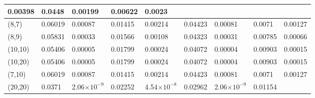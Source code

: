 \documentclass[10pt,twosided]{article}
\numberwithin{equation}{section}
\numberwithin{equation}{section}
\begin{document}
\begin{table}
\begin{tabular}{|p{41pt}|p{32pt}|p{38pt}|p{32pt}|p{38pt}|p{32pt}|p{38pt}|p{32pt}|p{38pt}|}
{0.00398
} & \parbox{32pt}{\raggedright
0.0448
} & \parbox{38pt}{\raggedright
0.00199
} & \parbox{32pt}{\raggedright
0.00622
} & \parbox{38pt}{\raggedright
0.0023
} \\
\hline
\parbox{41pt}{\raggedright
(8,7)
} & \parbox{32pt}{\raggedright
0.06019
} & \parbox{38pt}{\raggedright
0.00087
} & \parbox{32pt}{\raggedright
0.01415
} & \parbox{38pt}{\raggedright
0.00214
} & \parbox{32pt}{\raggedright
0.04423
} & \parbox{38pt}{\raggedright
0.00081
} & \parbox{32pt}{\raggedright
0.0071
} & \parbox{38pt}{\raggedright
0.00127
} \\
\hline
\parbox{41pt}{\raggedright
(8,9)
} & \parbox{32pt}{\raggedright
0.05831
} & \parbox{38pt}{\raggedright
0.00033
} & \parbox{32pt}{\raggedright
0.01566
} & \parbox{38pt}{\raggedright
0.00108
} & \parbox{32pt}{\raggedright
0.04323
} & \parbox{38pt}{\raggedright
0.00031
} & \parbox{32pt}{\raggedright
0.00785
} & \parbox{38pt}{\raggedright
0.00066
} \\
\hline
\parbox{41pt}{\raggedright
(10,10)
} & \parbox{32pt}{\raggedright
0.05406
} & \parbox{38pt}{\raggedright
0.00005
} & \parbox{32pt}{\raggedright
0.01799
} & \parbox{38pt}{\raggedright
0.00024
} & \parbox{32pt}{\raggedright
0.04072
} & \parbox{38pt}{\raggedright
0.00004
} & \parbox{32pt}{\raggedright
0.00903
} & \parbox{38pt}{\raggedright
0.00015
} \\
\hline
\parbox{41pt}{\raggedright
(10,20)
} & \parbox{32pt}{\raggedright
0.05406
} & \parbox{38pt}{\raggedright
0.00005
} & \parbox{32pt}{\raggedright
0.01799
} & \parbox{38pt}{\raggedright
0.00024
} & \parbox{32pt}{\raggedright
0.04072
} & \parbox{38pt}{\raggedright
0.00004
} & \parbox{32pt}{\raggedright
0.00903
} & \parbox{38pt}{\raggedright
0.00015
} \\
\hline
\parbox{41pt}{\raggedright
(7,10)
} & \parbox{32pt}{\raggedright
0.06019
} & \parbox{38pt}{\raggedright
0.00087
} & \parbox{32pt}{\raggedright
0.01415
} & \parbox{38pt}{\raggedright
0.00214
} & \parbox{32pt}{\raggedright
0.04423
} & \parbox{38pt}{\raggedright
0.00081
} & \parbox{32pt}{\raggedright
0.0071
} & \parbox{38pt}{\raggedright
0.00127
} \\
\hline
\parbox{41pt}{\raggedright
(20,20)
} & \parbox{32pt}{\raggedright
0.0371
} & \parbox{38pt}{\raggedright
\small{2.06$\times10^{-9}$}
} & \parbox{32pt}{\raggedright
0.02252
} & \parbox{38pt}{\raggedright
\small{4.54$\times10^{-8}$}
} & \parbox{32pt}{\raggedright
0.02962
} & \parbox{38pt}{\raggedright
\small{2.06$\times10^{-9}$}
} & \parbox{32pt}{\raggedright
0.01154
} & \parbox{38pt}{\raggedright
}
\end{tabular}
\end{table}
\end{document}
